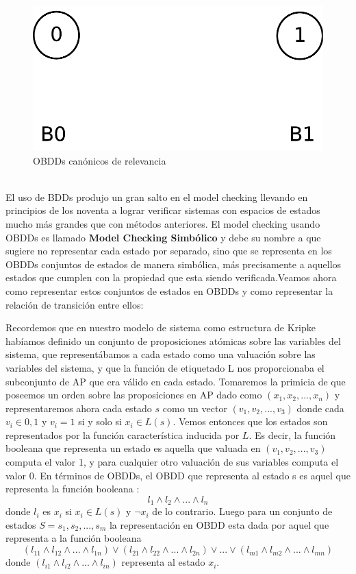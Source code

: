 \documentclass[titlepage, 12pt]{book}
\begin{document}
\begin{figure}
  \centering
    \includegraphics{Imagenes/canonicos.pdf}
  \caption{OBDDs can\'onicos de relevancia}
  \label{canonicos}
\end{figure}
~\\


El uso de BDDs produjo un gran salto en el model checking llevando en principios de los noventa a lograr verificar sistemas con espacios de estados mucho m\'as grandes que con m\'etodos anteriores. El model checking usando OBDDs es llamado \textbf{Model Checking Simb\'olico} y debe su nombre a que sugiere no representar cada estado por separado, sino que se representa en los OBDDs conjuntos de estados de manera simb\'olica, m\'as precisamente a aquellos estados que cumplen con la propiedad que esta siendo verificada.Veamos ahora como representar estos conjuntos de estados en OBDDs y como representar la relaci\'on de transici\'on entre ellos:

Recordemos que en nuestro modelo de sistema como estructura de Kripke hab\'iamos definido un conjunto de proposiciones at\'omicas sobre las variables del sistema, que represent\'abamos a cada estado como una valuaci\'on sobre las variables del sistema, y que la funci\'on de etiquetado L nos proporcionaba el subconjunto de AP que era v\'alido en cada estado. Tomaremos la primicia de que poseemos un orden sobre las proposiciones en AP dado como $(x_1,x_2,...,x_n)$ y representaremos ahora cada estado $s$ como un vector $(v_1,v_2,...,v_3)$ donde cada $v_i \in {0,1}$ y $v_i = 1$ si y solo si $x_i \in L(s)$. Vemos entonces que los estados son representados por la funci\'on caracter\'istica inducida por $L$. Es decir, la funci\'on booleana que representa un estado es aquella que valuada en $(v_1,v_2,...,v_3)$ computa el valor 1, y para cualquier otro valuaci\'on de sus variables computa el valor 0. En t\'erminos de OBDDs, el OBDD que representa al estado s es aquel que representa la funci\'on booleana : $$l_1 \wedge l_2 \wedge ... \wedge l_n$$ donde $l_i$ es $x_i$ si $x_i \in L(s)$ y $\neg x_i$ de lo contrario. Luego para un conjunto de estados $S = {s_1, s_2, ..., s_m}$ la representaci\'on en OBDD esta dada por aquel que representa a la funci\'on booleana $$(l_{11} \wedge l_{12} \wedge ... \wedge l_{1n}) \vee (l_{21} \wedge l_{22} \wedge ... \wedge l_{2n}) \vee ... \vee (l_{m1} \wedge l_{m2} \wedge ... \wedge l_{mn})$$ donde $(l_{i1} \wedge l_{i2} \wedge ... \wedge l_{in})$ representa al estado $x_i$.\\
\end{document}

